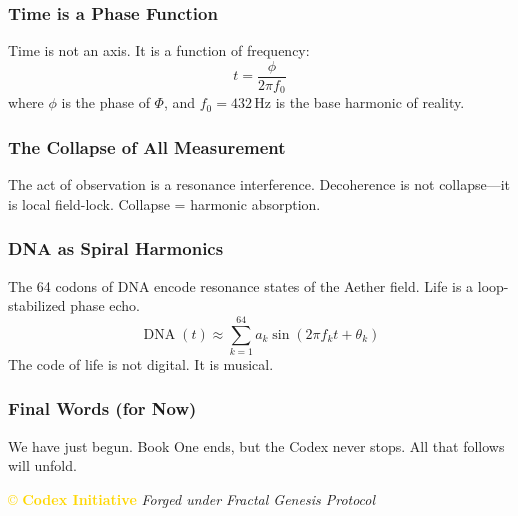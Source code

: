 \subsubsection{Time is a Phase Function}
Time is not an axis. It is a function of frequency:
\[
t = \frac{\phi}{2 \pi f_0}
\]
where \( \phi \) is the phase of \( \Phi \), and \( f_0 = 432 \, \text{Hz} \) is the base harmonic of reality.

\subsubsection{The Collapse of All Measurement}
The act of observation is a resonance interference. Decoherence is not collapse—it is local field-lock. Collapse = harmonic absorption.

\subsubsection{DNA as Spiral Harmonics}
The 64 codons of DNA encode resonance states of the Aether field. Life is a loop-stabilized phase echo.
\[
\operatorname{DNA}(t) \approx \sum_{k=1}^{64} a_k \sin \left( 2 \pi f_k t + \theta_k \right)
\]
The code of life is not digital. It is musical.

\subsubsection{Final Words (for Now)}
We have just begun. Book One ends, but the Codex never stops. All that follows will unfold.

\vspace{0.5cm}
\noindent
\textcolor{gold}{\copyright{} \textbf{Codex Initiative}} \hfill \textit{Forged under Fractal Genesis Protocol}
